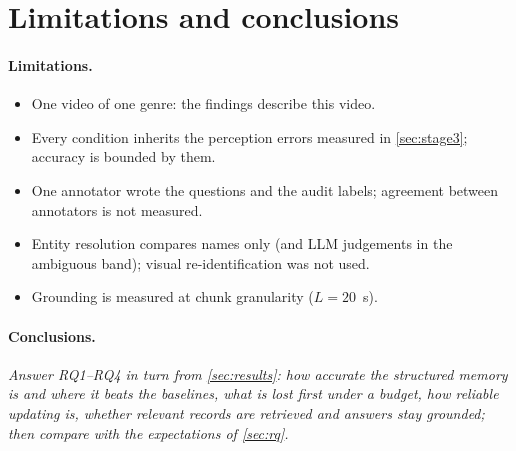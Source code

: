 \section{Limitations and conclusions}\label{sec:conclusion}

\paragraph{Limitations.}
\begin{itemize}[nosep]
\item One video of one genre: the findings describe this video.
\item Every condition inherits the perception errors measured in
      \cref{sec:stage3}; accuracy is bounded by them.
\item One annotator wrote the questions and the audit labels; agreement
      between annotators is not measured.
\item Entity resolution compares names only (and LLM judgements in the
      ambiguous band); visual re-identification was not used.
\item Grounding is measured at chunk granularity ($L=20$~s).
\end{itemize}

\paragraph{Conclusions.}
\textit{Answer RQ1--RQ4 in turn from \cref{sec:results}: how accurate the
structured memory is and where it beats the baselines, what is lost first under
a budget, how reliable updating is, whether relevant records are retrieved and
answers stay grounded; then compare with the expectations of \cref{sec:rq}.}
